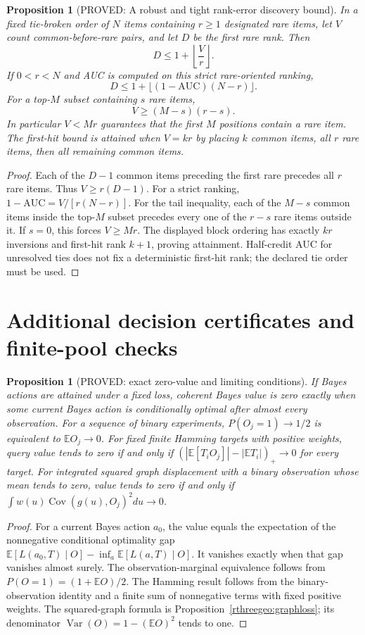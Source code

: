 \documentclass[11pt]{article}
\newtheorem{proposition}[theorem]{Proposition}
\theoremstyle{definition}
\theoremstyle{remark}
\begin{document}
\begin{proposition}[PROVED: A robust and tight rank-error discovery bound]
\label{rthreegeo:rank}
In a fixed tie-broken order of $N$ items containing $r\ge1$ designated
rare items, let $V$ count common-before-rare pairs, and let $D$ be the
first rare rank. Then
\[
 D\le1+\left\lfloor\frac Vr\right\rfloor.
\]
If $0<r<N$ and AUC is computed on this strict rare-oriented ranking,
\[
 D\le1+\lfloor(1-\mathrm{AUC})(N-r)\rfloor.
\]
For a top-$M$ subset containing $s$ rare items,
\[
 V\ge(M-s)(r-s).
\]
In particular $V<Mr$ guarantees that the first $M$ positions contain
a rare item. The first-hit bound is attained when $V=kr$ by placing
$k$ common items, all $r$ rare items, then all remaining common items.
\end{proposition}
\begin{proof}
Each of the $D-1$ common items preceding the first rare precedes all
$r$ rare items. Thus $V\ge r(D-1)$.
For a strict ranking, $1-\mathrm{AUC}=V/[r(N-r)]$.
For the tail inequality, each of the $M-s$ common items inside the
top-$M$ subset precedes every one of the $r-s$ rare items outside it.
If $s=0$, this forces $V\ge Mr$.
The displayed block ordering has exactly $kr$ inversions and first-hit
rank $k+1$, proving attainment. Half-credit AUC for unresolved ties
does not fix a deterministic first-hit rank; the declared tie order
must be used.
\end{proof}


\section{Additional decision certificates and finite-pool checks}

\begin{proposition}[PROVED: exact zero-value and limiting conditions]
\label{prop:zero-value-r3}
If Bayes actions are attained under a fixed loss, coherent Bayes value
is zero exactly when some current Bayes action is conditionally optimal
after almost every observation. For a sequence of binary experiments,
$P(O_j=1)\to1/2$ is equivalent to $\mathbb E O_j\to0$.
For fixed finite Hamming targets with positive weights, query value tends
to zero if and only if
$(|\mathbb E[T_iO_j]|-|\mathbb E T_i|)_+\to0$ for every target.
For integrated squared graph displacement with a binary observation
whose mean tends to zero, value tends to zero if and only if
$\int w(u)\operatorname{Cov}(g(u),O_j)^2du\to0$.
\end{proposition}
\begin{proof}
For a current Bayes action $a_0$, the value equals the expectation of
the nonnegative conditional optimality gap
$\mathbb E[L(a_0,T)\mid O]-\inf_a\mathbb E[L(a,T)\mid O]$.
It vanishes exactly when that gap vanishes almost surely.
The observation-marginal equivalence follows from
$P(O=1)=(1+\mathbb E O)/2$. The Hamming result follows from the
binary-observation identity and a finite sum of nonnegative terms
with fixed positive weights. The squared-graph formula is
Proposition~\ref{rthreegeo:graphloss}; its denominator
$\operatorname{Var}(O)=1-(\mathbb E O)^2$ tends to one.
\end{proof}
\end{document}
